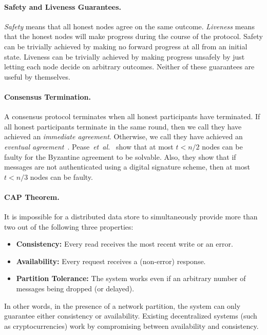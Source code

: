 \documentclass[11pt]{article}
\newcommand{\etal}{\textit{et~al.}}
\theoremstyle{mytheoremstyle}
\begin{document}
\paragraph{Safety and Liveness Guarantees.} \emph{Safety} means that all honest nodes agree on the same outcome. \emph{Liveness} means that the honest nodes will make progress during the course of the protocol. Safety can be trivially achieved by making no forward progress at all from an initial state. Liveness can be trivially achieved by making progress unsafely by just letting each node decide on arbitrary outcomes. Neither of these guarantees are useful by themselves.

\paragraph{Consensus Termination.} A consensus protocol terminates when all honest participants have terminated. If all honest participants terminate in the same round, then we call they have achieved an \emph{immediate agreement}. Otherwise, we call they have achieved an \emph{eventual agreement}~\cite{fischer}.
Pease~\etal~\cite{pease80reaching} show that at most ${t<n/2}$ nodes can be faulty for the Byzantine agreement to be solvable. Also, they show that if messages are not authenticated using a digital signature scheme, then at most ${t<n/3}$ nodes can be faulty.

\paragraph{CAP Theorem.} It is impossible for a distributed data store to simultaneously provide more than two out of the following three properties: 
\begin{itemize}
	\item \textbf{Consistency:} Every read receives the most recent write or an error.
	\item \textbf{Availability:} Every request receives a (non-error) response.
	\item \textbf{Partition Tolerance:} The system works even if an arbitrary number of messages being dropped (or delayed).
\end{itemize}
In other words, in the presence of a network partition, the system can only guarantee either consistency or availability. Existing decentralized systems (such as cryptocurrencies) work by compromising between availability and consistency.
\end{document}
